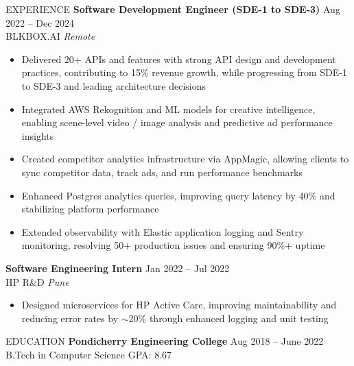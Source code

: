 \documentclass{resume}
\begin{document}
\begin{rSection}{EXPERIENCE}
\textbf{Software Development Engineer (SDE-1 to SDE-3)} \hfill Aug 2022 -- Dec 2024 \\
BLKBOX.AI \hfill \textit{Remote}
\begin{itemize}\itemsep -3pt
    \item Delivered 20+ APIs and features with strong API design and development practices, contributing to 15\% revenue growth, while progressing from SDE-1 to SDE-3 and leading architecture decisions
    \item Integrated AWS Rekognition and ML models for creative intelligence, enabling scene-level video / image analysis and predictive ad performance insights
    \item Created competitor analytics infrastructure via AppMagic, allowing clients to sync competitor data, track ads, and run performance benchmarks
    \item Enhanced Postgres analytics queries, improving query latency by 40\% and stabilizing platform performance
    \item Extended observability with Elastic application logging and Sentry monitoring, resolving 50+ production issues and ensuring 90\%+ uptime
\end{itemize}

\textbf{Software Engineering Intern} \hfill Jan 2022 -- Jul 2022 \\
HP R\&D \hfill \textit{Pune}
\begin{itemize}\itemsep -3pt
    \item Designed microservices for HP Active Care, improving maintainability and reducing error rates by $\sim$20\% through enhanced logging and unit testing
\end{itemize}

\end{rSection}

\begin{rSection}{EDUCATION}
\textbf{Pondicherry Engineering College} \hfill Aug 2018 -- June 2022 \\
B.Tech in Computer Science \hfill GPA: 8.67
\end{rSection}
\end{document}
